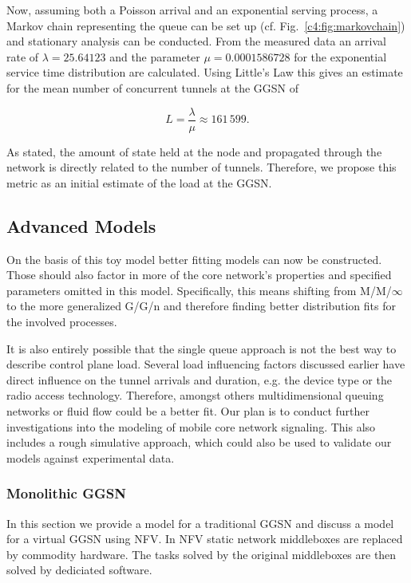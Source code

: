 Now, assuming both a Poisson arrival and an exponential serving process, a Markov chain representing the queue can be set up (cf. Fig.~\ref{c4:fig:markovchain}) and stationary analysis can be conducted. From the measured data an arrival rate of $\lambda=25.64123$ and the parameter $\mu=0.0001586728$ for the exponential service time distribution are calculated. Using Little's Law this gives an estimate for the mean number of concurrent tunnels at the \gls{GGSN} of 

$$
L=\frac{\lambda}{\mu}\approx 161\,599. %
$$

As stated, the amount of state held at the node and propagated through the network is directly related to the number of tunnels. Therefore, we propose this metric as an initial estimate of the load at the \gls{GGSN}.


\subsection{Advanced Models} 


On the basis of this toy model better fitting models can now be constructed. Those should also factor in more of the core network's properties and specified parameters omitted in this model. Specifically, this means shifting from M/M/$\infty$ to the more generalized G/G/n and therefore finding better distribution fits for the involved processes.

It is also entirely possible that the single queue approach is not the best way to describe control plane load. Several load influencing factors discussed earlier have direct influence on the tunnel arrivals and duration, e.g. the device type or the radio access technology. Therefore, amongst others multidimensional queuing networks or fluid flow could be a better fit. Our plan is to conduct further investigations into the modeling of mobile core network signaling. This also includes a rough simulative approach, which could also be used to validate our models against experimental data.


\subsubsection{Monolithic GGSN}

In this section we provide a model for a traditional \gls{GGSN} and discuss a model for a virtual \gls{GGSN} using \gls{NFV}. In \gls{NFV} \cite{nfv_whitepaper} static network middleboxes are replaced by commodity hardware. The tasks solved by the original middleboxes are then solved by dediciated software.


